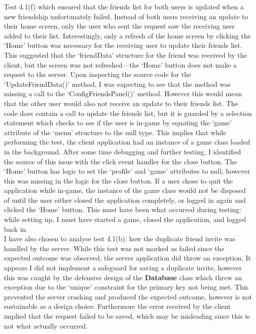\documentclass{article}
\begin{document}
Test 4.1(f) which ensured that the friends list for both users is updated when a new friendship unfortunately failed. Instead of both users receiving an update to their home screen, only the user who sent the request saw the receiving user added to their list. Interestingly, only a refresh of the home screen by clicking the `Home' button was necessary for the receiving user to update their friends list. This suggested that the `friendData' structure for the friend was received by the client, but the screen was not refreshed---the `Home' button does not make a request to the server. Upon inspecting the source code for the `UpdateFriendData()' method, I was expecting to see that the method was missing a call to the `ConfigFriendsPanel()' method. However this would mean that the other user would also not receive an update to their friends list. The code does contain a call to update the friends list, but it is guarded by a selection statement which checks to see if the user is in-game by equating the `game' attribute of the `menu' structure to the null type. This implies that while performing the test, the client application had an instance of a game class loaded in the background. After some time debugging and further testing, I identified the source of this issue with the click event handler for the close button. The `Home' button has logic to set the `profile' and `game' attributes to null, however this was missing in the logic for the close button. If a user chose to quit the application while in-game, the instance of the game class would not be disposed of until the user either closed the application completely, or logged in again and clicked the `Home' button. This must have been what occurred during testing: while setting up, I must have started a game, closed the application, and logged back in. \\

I have also chosen to analyse test 4.1(b): how the duplicate friend invite was handled by the server. While this test was not marked as failed since the expected outcome was observed, the server application did throw an exception. It appears I did not implement a safeguard for saving a duplicate invite, however this was caught by the defensive design of the \textbf{Database} class which threw an exception due to the `unique' constraint for the primary key not being met. This prevented the server crashing and produced the expected outcome, however is not sustainable as a design choice. Furthermore the error received by the client implied that the request failed to be saved, which may be misleading since this is not what actually occurred.
\end{document}
